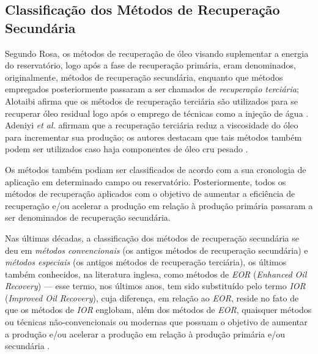 \subsection{Classifica\c{c}\~{a}o dos M\'{e}todos de Recupera\c{c}\~{a}o Secund\'{a}ria}
Segundo Rosa, os m\'{e}todos de recupera\c{c}\~{a}o de \'{o}leo visando suplementar a energia do reservat\'{o}rio, logo ap\'{o}s a fase de recupera\c{c}\~{a}o prim\'{a}ria, eram denominados, originalmente, m\'{e}todos de recupera\c{c}\~{a}o secund\'{a}ria, enquanto que m\'{e}todos empregados posteriormente passaram a ser chamados de \textit{recupera\c{c}\~{a}o terci\'{a}ria}; Alotaibi afirma que os m\'{e}todos de recupera\c{c}\~{a}o terci\'{a}ria s\~{a}o utilizados para se recuperar \'{o}leo residual logo ap\'{o}s o emprego de t\'{e}cnicas como a inje\c{c}\~{a}o de \'{a}gua \cite{alotaibi}. Adeniyi \textit{et al.} afirmam que a recupera\c{c}\~{a}o terci\'{a}ria reduz a viscosidade do \'{o}leo para incrementar sua produ\c{c}\~{a}o; os autores destacam que tais m\'{e}todos tamb\'{e}m podem ser utilizados caso haja componentes de \'{o}leo cru pesado \cite{adeniyi2008}. 

Os m\'{e}todos tamb\'{e}m podiam ser classificados de acordo com a sua cronologia de aplica\c{c}\~{a}o em determinado campo ou reservat\'{o}rio. Posteriormente, todos os m\'{e}todos de recupera\c{c}\~{a}o aplicados com o objetivo de aumentar a efici\^{e}ncia de recupera\c{c}\~{a}o e/ou acelerar a produ\c{c}\~{a}o em rela\c{c}\~{a}o \`{a} produ\c{c}\~{a}o prim\'{a}ria passaram a ser denominados de recupera\c{c}\~{a}o secund\'{a}ria.

Nas \'{u}ltimas d\'{e}cadas, a classifica\c{c}\~{a}o dos m\'{e}todos de recupera\c{c}\~{a}o secund\'{a}ria se deu em \textit{m\'{e}todos convencionais} (os antigos m\'{e}todos de recupera\c{c}\~{a}o secund\'{a}ria) e \textit{m\'{e}todos especiais} (os antigos m\'{e}todos de recupera\c{c}\~{a}o terci\'{a}ria), os \'{u}ltimos tamb\'{e}m conhecidos, na literatura inglesa, como m\'{e}todos de \textit{EOR} (\textit{Enhanced Oil Recovery}) --- esse termo, nos \'{u}ltimos anos, tem sido substitu\'{i}do pelo termo \textit{IOR} (\textit{Improved Oil Recovery}), cuja diferen\c{c}a, em rela\c{c}\~{a}o ao \textit{EOR}, reside no fato de que os m\'{e}todos de \textit{IOR} englobam, al\'{e}m dos m\'{e}todos de \textit{EOR}, quaisquer m\'{e}todos ou t\'{e}cnicas n\~{a}o-convencionais ou modernas que possuam o objetivo de aumentar a produ\c{c}\~{a}o e/ou acelerar a produ\c{c}\~{a}o em rela\c{c}\~{a}o \`{a} produ\c{c}\~{a}o prim\'{a}ria e/ou secund\'{a}ria \cite[p. 564]{engres}. 

